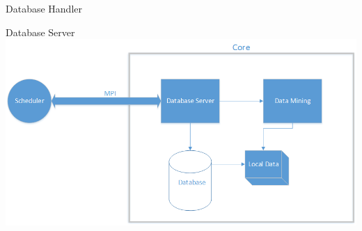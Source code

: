 \begin{frame}{Database Handler}
	\end{frame}
	
	\begin{frame}{Database Server}
	\includegraphics[width=1.0\textwidth]{images/databaseserver.png}
	\end{frame}
	
	
	
